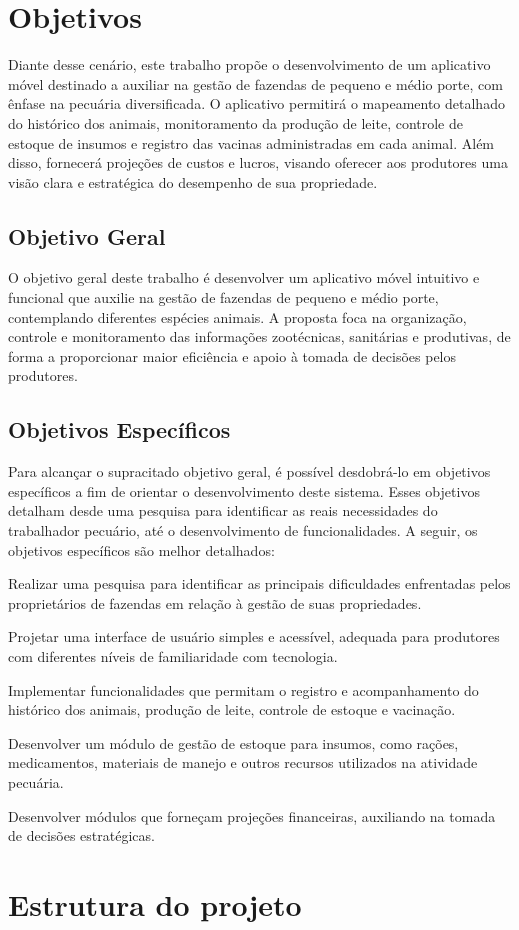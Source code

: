 \section{Objetivos}
Diante desse cenário, este trabalho propõe o desenvolvimento de um aplicativo móvel destinado a auxiliar na gestão de fazendas de pequeno e médio porte, com ênfase na pecuária diversificada. O aplicativo permitirá o mapeamento detalhado do histórico dos animais, monitoramento da produção de leite, controle de estoque de insumos e registro das vacinas administradas em cada animal. Além disso, fornecerá projeções de custos e lucros, visando oferecer aos produtores uma visão clara e estratégica do desempenho de sua propriedade.
\subsection{Objetivo Geral}
\label{sec:objetivo-geral}
O objetivo geral deste trabalho é desenvolver um aplicativo móvel intuitivo e funcional que auxilie na gestão de fazendas de pequeno e médio porte, contemplando diferentes espécies animais. A proposta foca na organização, controle e monitoramento das informações zootécnicas, sanitárias e produtivas, de forma a proporcionar maior eficiência e apoio à tomada de decisões pelos produtores.

\subsection{Objetivos Específicos}
\label{sec:objetivos-especificos}

Para alcançar o supracitado objetivo geral, é possível desdobrá-lo em objetivos específicos a fim de orientar o desenvolvimento deste sistema. Esses objetivos detalham desde uma pesquisa para identificar as reais necessidades do trabalhador pecuário, até o desenvolvimento de funcionalidades. A seguir, os objetivos específicos são melhor detalhados:

	\begin{alineas}
		\item Realizar uma pesquisa para identificar as principais dificuldades enfrentadas pelos proprietários de fazendas em relação à gestão de suas propriedades.
		\item Projetar uma interface de usuário simples e acessível, adequada para produtores com diferentes níveis de familiaridade com tecnologia.
		\item Implementar funcionalidades que permitam o registro e acompanhamento do histórico dos animais, produção de leite, controle de estoque e vacinação.
        \item Desenvolver um módulo de gestão de estoque para insumos, como rações, medicamentos, materiais de manejo e outros recursos utilizados na atividade pecuária.
		\item Desenvolver módulos que forneçam projeções financeiras, auxiliando na tomada de decisões estratégicas.
	\end{alineas}
\section{Estrutura do projeto}
